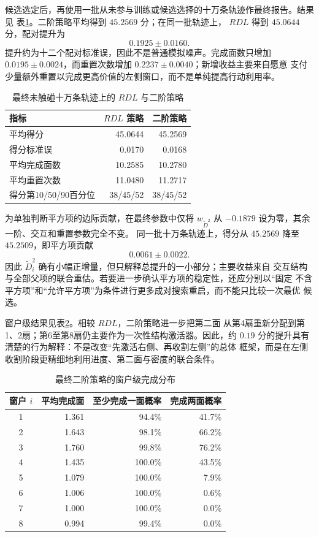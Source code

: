 \documentclass[UTF8,11pt,openany]{ctexrep}
\begin{document}
候选选定后，再使用一批从未参与训练或候选选择的十万条轨迹作最终报告。结果见
表\ref{tab:second-order-final}。二阶策略平均得到 $45.2569$ 分；在同一批轨迹上，
$RDL$ 得到 $45.0644$ 分，配对提升为
\[
0.1925\pm0.0160.
\]
提升约为十二个配对标准误，因此不是普通模拟噪声。完成面数只增加
$0.0195\pm0.0024$，而重置次数增加 $0.2237\pm0.0040$；新增收益主要来自愿意
支付少量额外重置以完成更高价值的左侧窗口，而不是单纯提高行动利用率。

\begin{table}[htbp]
\centering
\caption{最终未触碰十万条轨迹上的 $RDL$ 与二阶策略}
\label{tab:second-order-final}
\begin{tabular}{lrr}
\toprule
指标 & $RDL$ 策略 & 二阶策略 \\
\midrule
平均得分 & 45.0644 & 45.2569 \\
得分标准误 & 0.0170 & 0.0168 \\
平均完成面数 & 10.2585 & 10.2780 \\
平均重置次数 & 11.0480 & 11.2717 \\
得分第10/50/90百分位 & 38/45/52 & 38/45/52 \\
\bottomrule
\end{tabular}
\end{table}

为单独判断平方项的边际贡献，在最终参数中仅将
$w_{\widetilde D^2}$ 从 $-0.1879$ 设为零，其余一阶、交互和重置参数完全不变。
同一批十万条轨迹上，得分从 $45.2569$ 降至 $45.2509$，即平方项贡献
\[
0.0061\pm0.0022.
\]
因此 $\widetilde D_i^2$ 确有小幅正增量，但只解释总提升的一小部分；主要收益来自
交互结构与全部父项的联合重估。若要进一步确认平方项的稳定性，还应分别以“固定
不含平方项”和“允许平方项”为条件进行更多成对搜索重启，而不能只比较一次最优
候选。

窗户级结果见表\ref{tab:second-order-window}。相较 $RDL$，二阶策略进一步把第二面
从第4扇重新分配到第1、2扇；第6至第8扇仍主要作为一次性结构激活器。因此，约
$0.19$ 分的提升具有清楚的行为解释：不是改变“先激活右侧、再收割左侧”的总体
框架，而是在左侧收割阶段更精细地利用进度、第二面与密度的联合条件。

\begin{table}[htbp]
\centering
\caption{最终二阶策略的窗户级完成分布}
\label{tab:second-order-window}
\begin{tabular}{crrr}
\toprule
窗户 $i$ & 平均完成面 & 至少完成一面概率 & 完成两面概率 \\
\midrule
1 & 1.361 & 94.4\% & 41.7\% \\
2 & 1.643 & 98.1\% & 66.2\% \\
3 & 1.760 & 99.8\% & 76.2\% \\
4 & 1.435 & 100.0\% & 43.5\% \\
5 & 1.079 & 100.0\% & 7.9\% \\
6 & 1.006 & 100.0\% & 0.6\% \\
7 & 1.000 & 100.0\% & 0.0\% \\
8 & 0.994 & 99.4\% & 0.0\% \\
\bottomrule
\end{tabular}
\end{table}
\end{document}
